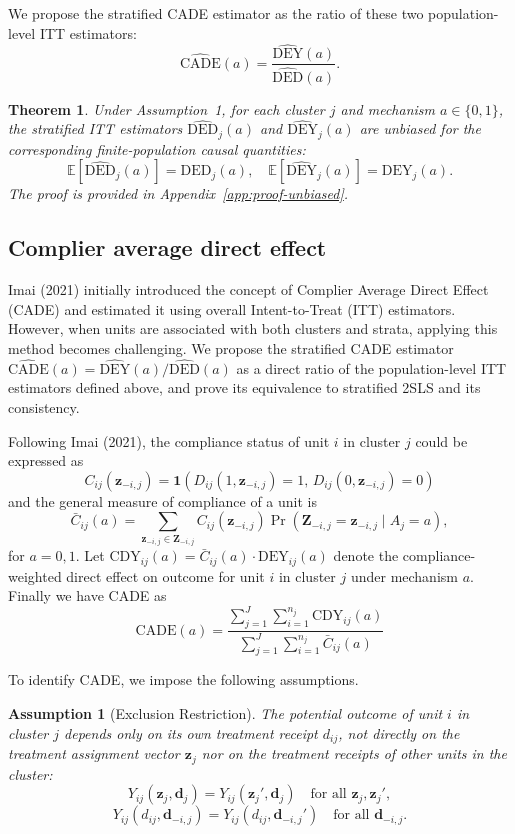 \documentclass[a4paper, 12pt]{article}
\newtheorem{thm}{Theorem}
\newtheorem{assumption}{Assumption}
\begin{document}
We propose the stratified CADE estimator as the ratio of these two population-level ITT estimators:
$$
\widehat{\mathrm{CADE}}(a) = \frac{\widehat{\mathrm{DEY}}(a)}{\widehat{\mathrm{DED}}(a)}.
$$

\begin{thm}
Under Assumption~1, for each cluster $j$ and mechanism $a \in \{0,1\}$, the stratified ITT estimators $\widehat{\mathrm{DED}}_j(a)$ and $\widehat{\mathrm{DEY}}_j(a)$ are unbiased for the corresponding finite-population causal quantities:
$$
\mathbb{E}\!\left[\widehat{\mathrm{DED}}_{j}(a)\right] = \mathrm{DED}_{j}(a),
\quad
\mathbb{E}\!\left[\widehat{\mathrm{DEY}}_{j}(a)\right] = \mathrm{DEY}_{j}(a).
$$
The proof is provided in Appendix~\ref{app:proof-unbiased}.
\end{thm}

\subsection{Complier average direct effect}
 Imai (2021) initially introduced the concept of Complier Average Direct Effect (CADE) and estimated it using overall Intent-to-Treat (ITT) estimators. However, when units are associated with both clusters and strata, applying this method becomes challenging. We propose the stratified CADE estimator $\widehat{\mathrm{CADE}}(a) = \widehat{\mathrm{DEY}}(a)/\widehat{\mathrm{DED}}(a)$ as a direct ratio of the population-level ITT estimators defined above, and prove its equivalence to stratified 2SLS and its consistency.

Following Imai (2021), the compliance status of unit $i$ in cluster $j$ could be expressed as 
$$
C_{ij}(\mathbf{z}_{-i,j}) = \mathbf{1}\!\left(D_{ij}(1, \mathbf{z}_{-i,j}) = 1,\, D_{ij}(0, \mathbf{z}_{-i,j}) = 0\right)$$
and the general measure of compliance of a unit is
$$
\bar{C}_{ij}(a) = \sum_{\mathbf{z}_{-i,j}\in \mathbf{Z}_{-i,j}} C_{ij}(\mathbf{z}_{-i,j}) \Pr(\mathbf{Z}_{-i,j} = \mathbf{z}_{-i,j} \mid A_j = a),
$$
for $a = 0,1$. Let $\text{CDY}_{ij}(a) = \bar{C}_{ij}(a) \cdot \mathrm{DEY}_{ij}(a)$ denote the compliance-weighted direct effect on outcome for unit $i$ in cluster $j$ under mechanism $a$. Finally we have CADE as
$$
\text{CADE}(a) = \frac{\sum_{j=1}^{J}\sum_{i=1}^{n_j}\text{CDY}_{ij}(a)}{\sum_{j=1}^{J}\sum_{i=1}^{n_j}\bar{C}_{ij}(a)}
$$

To identify CADE, we impose the following assumptions.

\begin{assumption}[Exclusion Restriction]\quad

The potential outcome of unit $i$ in cluster $j$ depends only on its own treatment receipt $d_{ij}$, not directly on the treatment assignment vector $\mathbf{z}_j$ nor on the treatment receipts of other units in the cluster:
$$Y_{ij}(\mathbf{z}_j, \mathbf{d}_j) = Y_{ij}(\mathbf{z}_j', \mathbf{d}_j)
\quad \text{for all } \mathbf{z}_j, \mathbf{z}_j',$$
$$Y_{ij}(d_{ij}, \mathbf{d}_{-i,j}) = Y_{ij}(d_{ij}, \mathbf{d}_{-i,j}')
\quad \text{for all } \mathbf{d}_{-i,j}.$$
\end{assumption}
\end{document}
